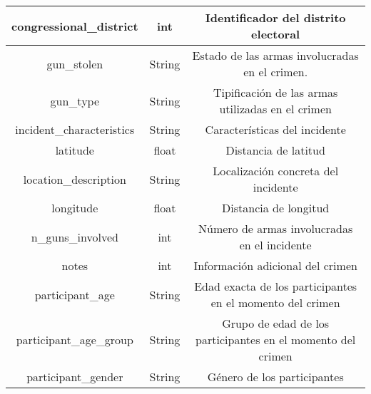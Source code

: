 \documentclass[11pt,a4paper]{article}
\begin{document}
\begin{table}[H]
{\begin{tabular}{|c|c|c|}
congressional\_district        & int                   & Identificador del distrito electoral                                                                                             \\ \hline
gun\_stolen                    & String                & Estado de las armas involucradas en el crimen.                                                                                   \\ \hline
gun\_type                      & String                & Tipificación de las armas utilizadas en el crimen                                                                                \\ \hline
incident\_characteristics      & String                & Características del incidente                                                                                                    \\ \hline
latitude                       & float                 & Distancia de latitud                                                                                                             \\ \hline
location\_description          & String                & Localización concreta del incidente                                                                                              \\ \hline
longitude                      & float                 & Distancia de longitud                                                                                                            \\ \hline
n\_guns\_involved              & int                   & Número de armas involucradas en el incidente                                                                                     \\ \hline
notes                          & int                   & Información adicional del crimen                                                                                                 \\ \hline
participant\_age               & String                & Edad exacta de los participantes en el momento del crimen                                                                        \\ \hline
participant\_age\_group        & String                & Grupo de edad de los participantes en el momento del crimen                                                                      \\ \hline
participant\_gender            & String                & Género de los participantes                                                                                                      \\ \hline

\end{tabular}}
\end{table}
\end{document}
